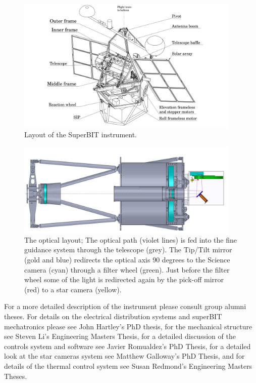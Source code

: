 \begin{figure}
    \begin{small}
        \begin{center}
            \includegraphics[width=0.95\textwidth]{Introduction/figs/bit_model.png}
        \end{center}
        \caption{Layout of the SuperBIT instrument.}
        \label{fig:bit}
    \end{small}
\end{figure}



\begin{figure}
    \begin{small}
        \begin{center}
            \includegraphics[width=0.95\textwidth]{Introduction/figs/optical_path.png}
        \end{center}
        \caption{The optical layout; The optical path (violet lines) is fed into the fine guidance system through the telescope (grey). The Tip/Tilt mirror (gold and blue) redirects the optical axis 90 degrees to the Science camera (cyan) through a filter wheel (green). Just before the filter wheel some of the light is redirected again by the pick-off mirror (red) to a star camera (yellow).}
        \label{fig:optics}
    \end{small}
\end{figure}

\par
For a more detailed description of the instrument please consult group alumni theses. For details on the electrical distribution systems and
superBIT mechatronics please see John Hartley's PhD thesis, for the mechanical structure see Steven Li’s Engineering Masters Thesis, for a detailed discussion of the controls system and software see Javier Romualdez’s PhD Thesis, for a detailed look at the star cameras system see Matthew Galloway’s PhD Thesis, and for details of the thermal control system see Susan Redmond’s Engineering Masters Theses.

